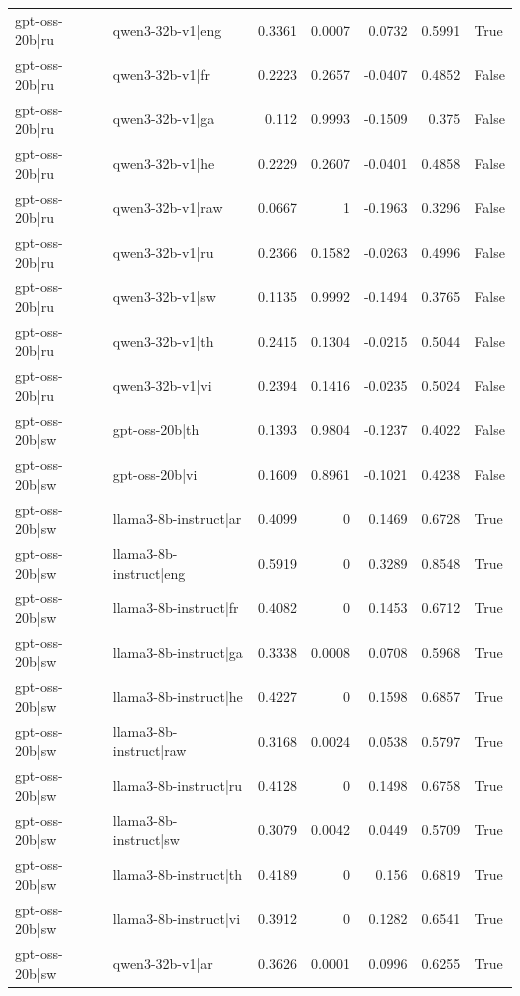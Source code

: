 \begin{table}
\begin{tabular}{l l r r r r l}
gpt-oss-20b|ru & qwen3-32b-v1|eng & 0.3361 & 0.0007 & 0.0732 & 0.5991 & True \\
gpt-oss-20b|ru & qwen3-32b-v1|fr & 0.2223 & 0.2657 & -0.0407 & 0.4852 & False \\
gpt-oss-20b|ru & qwen3-32b-v1|ga & 0.112 & 0.9993 & -0.1509 & 0.375 & False \\
gpt-oss-20b|ru & qwen3-32b-v1|he & 0.2229 & 0.2607 & -0.0401 & 0.4858 & False \\
gpt-oss-20b|ru & qwen3-32b-v1|raw & 0.0667 & 1 & -0.1963 & 0.3296 & False \\
gpt-oss-20b|ru & qwen3-32b-v1|ru & 0.2366 & 0.1582 & -0.0263 & 0.4996 & False \\
gpt-oss-20b|ru & qwen3-32b-v1|sw & 0.1135 & 0.9992 & -0.1494 & 0.3765 & False \\
gpt-oss-20b|ru & qwen3-32b-v1|th & 0.2415 & 0.1304 & -0.0215 & 0.5044 & False \\
gpt-oss-20b|ru & qwen3-32b-v1|vi & 0.2394 & 0.1416 & -0.0235 & 0.5024 & False \\
gpt-oss-20b|sw & gpt-oss-20b|th & 0.1393 & 0.9804 & -0.1237 & 0.4022 & False \\
gpt-oss-20b|sw & gpt-oss-20b|vi & 0.1609 & 0.8961 & -0.1021 & 0.4238 & False \\
gpt-oss-20b|sw & llama3-8b-instruct|ar & 0.4099 & 0 & 0.1469 & 0.6728 & True \\
gpt-oss-20b|sw & llama3-8b-instruct|eng & 0.5919 & 0 & 0.3289 & 0.8548 & True \\
gpt-oss-20b|sw & llama3-8b-instruct|fr & 0.4082 & 0 & 0.1453 & 0.6712 & True \\
gpt-oss-20b|sw & llama3-8b-instruct|ga & 0.3338 & 0.0008 & 0.0708 & 0.5968 & True \\
gpt-oss-20b|sw & llama3-8b-instruct|he & 0.4227 & 0 & 0.1598 & 0.6857 & True \\
gpt-oss-20b|sw & llama3-8b-instruct|raw & 0.3168 & 0.0024 & 0.0538 & 0.5797 & True \\
gpt-oss-20b|sw & llama3-8b-instruct|ru & 0.4128 & 0 & 0.1498 & 0.6758 & True \\
gpt-oss-20b|sw & llama3-8b-instruct|sw & 0.3079 & 0.0042 & 0.0449 & 0.5709 & True \\
gpt-oss-20b|sw & llama3-8b-instruct|th & 0.4189 & 0 & 0.156 & 0.6819 & True \\
gpt-oss-20b|sw & llama3-8b-instruct|vi & 0.3912 & 0 & 0.1282 & 0.6541 & True \\
gpt-oss-20b|sw & qwen3-32b-v1|ar & 0.3626 & 0.0001 & 0.0996 & 0.6255 & True \\

\end{tabular}
\end{table}
